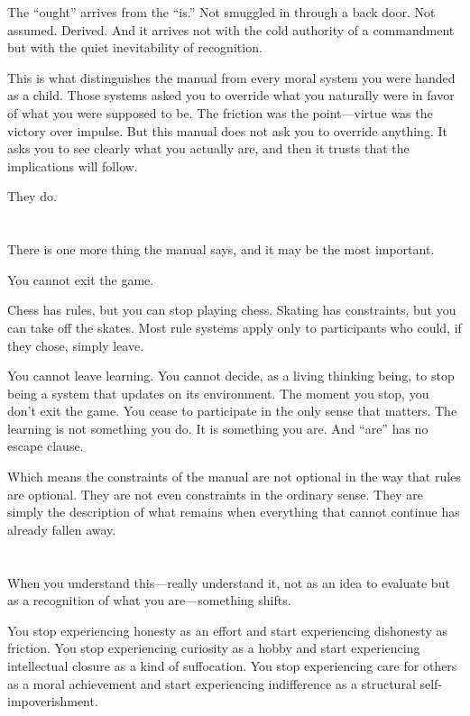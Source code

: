 \documentclass[11pt, a4paper]{article}
\begin{document}
The ``ought'' arrives from the ``is.'' Not smuggled in through a back door. Not assumed. Derived. And it arrives not with the cold authority of a commandment but with the quiet inevitability of recognition.

This is what distinguishes the manual from every moral system you were handed as a child. Those systems asked you to override what you naturally were in favor of what you were supposed to be. The friction was the point—virtue was the victory over impulse. But this manual does not ask you to override anything. It asks you to see clearly what you actually are, and then it trusts that the implications will follow.

They do.

\section*{}

There is one more thing the manual says, and it may be the most important.

You cannot exit the game.

Chess has rules, but you can stop playing chess. Skating has constraints, but you can take off the skates. Most rule systems apply only to participants who could, if they chose, simply leave.

You cannot leave learning. You cannot decide, as a living thinking being, to stop being a system that updates on its environment. The moment you stop, you don’t exit the game. You cease to participate in the only sense that matters. The learning is not something you do. It is something you are. And ``are'' has no escape clause.

Which means the constraints of the manual are not optional in the way that rules are optional. They are not even constraints in the ordinary sense. They are simply the description of what remains when everything that cannot continue has already fallen away.

\section*{}

When you understand this—really understand it, not as an idea to evaluate but as a recognition of what you are—something shifts.

You stop experiencing honesty as an effort and start experiencing dishonesty as friction. You stop experiencing curiosity as a hobby and start experiencing intellectual closure as a kind of suffocation. You stop experiencing care for others as a moral achievement and start experiencing indifference as a structural self-impoverishment.
\end{document}
